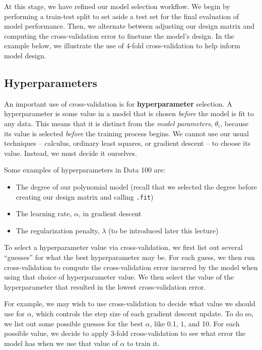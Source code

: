 \documentclass[
  letterpaper,
  DIV=11,
  numbers=noendperiod]{scrreprt}
\providecommand{\tightlist}{%
  \setlength{\itemsep}{0pt}\setlength{\parskip}{0pt}}\usepackage{longtable,booktabs,array}
\begin{document}
At this stage, we have refined our model selection workflow. We begin by
performing a train-test split to set aside a test set for the final
evaluation of model performance. Then, we alternate between adjusting
our design matrix and computing the cross-validation error to finetune
the model's design. In the example below, we illustrate the use of
4-fold cross-validation to help inform model design.

\subsection{Hyperparameters}\label{hyperparameters}

An important use of cross-validation is for \textbf{hyperparameter}
selection. A hyperparameter is some value in a model that is chosen
\emph{before} the model is fit to any data. This means that it is
distinct from the \emph{model parameters}, \(\theta_i\), because its
value is selected \emph{before} the training process begins. We cannot
use our usual techniques -- calculus, ordinary least squares, or
gradient descent -- to choose its value. Instead, we must decide it
ourselves.

Some examples of hyperparameters in Data 100 are:

\begin{itemize}
\tightlist
\item
  The degree of our polynomial model (recall that we selected the degree
  before creating our design matrix and calling \texttt{.fit})
\item
  The learning rate, \(\alpha\), in gradient descent
\item
  The regularization penalty, \(\lambda\) (to be introduced later this
  lecture)
\end{itemize}

To select a hyperparameter value via cross-validation, we first list out
several ``guesses'' for what the best hyperparameter may be. For each
guess, we then run cross-validation to compute the cross-validation
error incurred by the model when using that choice of hyperparameter
value. We then select the value of the hyperparameter that resulted in
the lowest cross-validation error.

For example, we may wish to use cross-validation to decide what value we
should use for \(\alpha\), which controls the step size of each gradient
descent update. To do so, we list out some possible guesses for the best
\(\alpha\), like 0.1, 1, and 10. For each possible value, we decide to
apply 3-fold cross-validation to see what error the model has when we
use that value of \(\alpha\) to train it.
\end{document}
